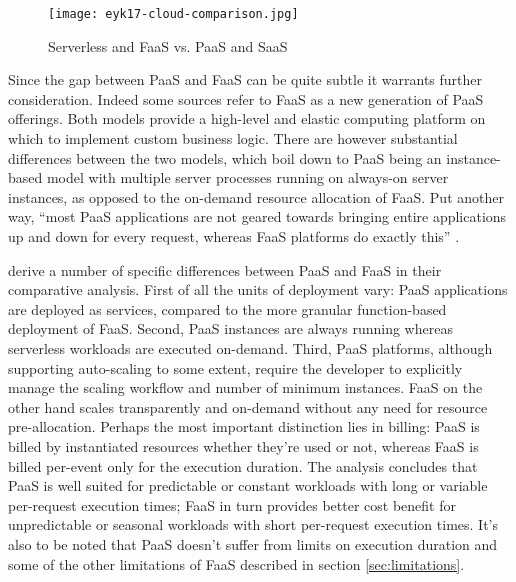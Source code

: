 \begin{figure}[h]
  \centering
  \texttt{[image: eyk17-cloud-comparison.jpg]}
  \caption{Serverless and FaaS vs. PaaS and SaaS \parencite{van2017spec}}
  \label{fig:cloudSpectrum}
\end{figure}

Since the gap between PaaS and FaaS can be quite subtle it warrants further consideration. Indeed some sources \parencite[e.g.][]{adzic2017serverless} refer to FaaS as a new generation of PaaS offerings. Both models provide a high-level and elastic computing platform on which to implement custom business logic. There are however substantial differences between the two models, which boil down to PaaS being an instance-based model with multiple server processes running on always-on server instances, as opposed to the on-demand resource allocation of FaaS. Put another way, ``most PaaS applications are not geared towards bringing entire applications up and down for every request, whereas FaaS platforms do exactly this'' \parencite{robert2016serverlessarchitectures}.

\textcite{albuquerque17faaspaas} derive a number of specific differences between PaaS and FaaS in their comparative analysis. First of all the units of deployment vary: PaaS applications are deployed as services, compared to the more granular function-based deployment of FaaS. Second, PaaS instances are always running whereas serverless workloads are executed on-demand. Third, PaaS platforms, although supporting auto-scaling to some extent, require the developer to explicitly manage the scaling workflow and number of minimum instances. FaaS on the other hand scales transparently and on-demand without any need for resource pre-allocation. Perhaps the most important distinction lies in billing: PaaS is billed by instantiated resources whether they're used or not, whereas FaaS is billed per-event only for the execution duration. The analysis concludes that PaaS is well suited for predictable or constant workloads with long or variable per-request execution times; FaaS in turn provides better cost benefit for unpredictable or seasonal workloads with short per-request execution times. It's also to be noted that PaaS doesn't suffer from limits on execution duration and some of the other limitations of FaaS described in section \ref{sec:limitations}.


